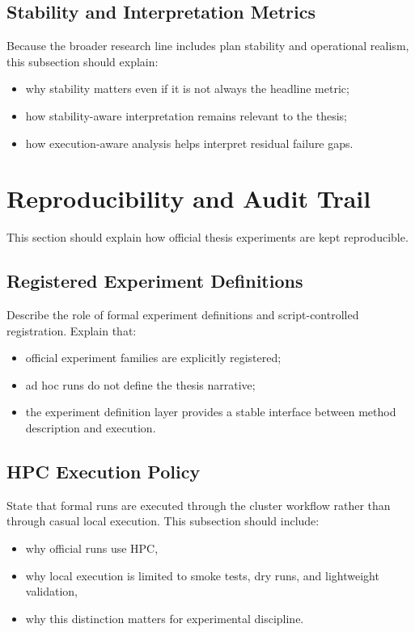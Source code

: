 \subsection{Stability and Interpretation Metrics}

Because the broader research line includes plan stability and operational realism, this subsection should explain:
\begin{itemize}
    \item why stability matters even if it is not always the headline metric;
    \item how stability-aware interpretation remains relevant to the thesis;
    \item how execution-aware analysis helps interpret residual failure gaps.
\end{itemize}

\section{Reproducibility and Audit Trail}

This section should explain how official thesis experiments are kept reproducible.

\subsection{Registered Experiment Definitions}

Describe the role of formal experiment definitions and script-controlled registration. Explain that:
\begin{itemize}
    \item official experiment families are explicitly registered;
    \item ad hoc runs do not define the thesis narrative;
    \item the experiment definition layer provides a stable interface between method description and execution.
\end{itemize}

\subsection{HPC Execution Policy}

State that formal runs are executed through the cluster workflow rather than through casual local execution. This subsection should include:
\begin{itemize}
    \item why official runs use HPC,
    \item why local execution is limited to smoke tests, dry runs, and lightweight validation,
    \item why this distinction matters for experimental discipline.
\end{itemize}

